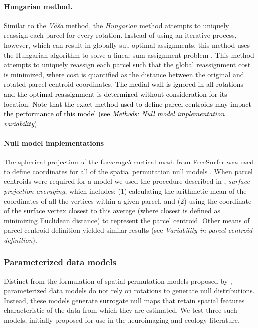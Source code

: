 \documentclass[12pt,aps,pra,reprint,showkeys]{revtex4-1}
\newcommand{\nimg}[1]{\textcolor{black}{{#1}}}
\begin{document}
\paragraph*{Hungarian method.}

Similar to the \textit{V{\'a}{\v{s}}a} method, the \textit{Hungarian} method attempts to uniquely reassign each parcel for every rotation.
Instead of using an iterative process, however, which can result in globally sub-optimal assignments, this method uses the Hungarian algorithm to solve a linear sum assignment problem \citep{kuhn1955hungarian}.
This method attempts to uniquely reassign each parcel such that the global reassignment cost is minimized, where cost is quantified as the distance between the original and rotated parcel centroid coordinates.
\nimg{The medial wall is ignored in all rotations and the optimal reassignment is determined without consideration for its location.
Note that the exact method used to define parcel centroids may impact the performance of this model (see \textit{Methods: Null model implementation variability}).}

\paragraph*{Null model implementations}

The spherical projection of the fsaverage5 cortical mesh from FreeSurfer was used to define coordinates for all of the spatial permutation null models \citep{fischl1999humanbrainmap}.
When parcel centroids were required for a model we used the procedure described in \citet{vazquezrodriguez2019pnas}, \textit{surface-projection averaging}, which includes: (1) calculating the arithmetic mean of the coordinates of all the vertices within a given parcel, and (2) using the coordinate of the surface vertex closest to this average (where closest is defined as minimizing Euclidean distance) to represent the parcel centroid.
Other means of parcel centroid definition yielded similar results (see \textit{Variability in parcel centroid definition}).

\subsubsection*{Parameterized data models}

Distinct from the formulation of spatial permutation models proposed by \citet{alexanderbloch2018neuroimage}, parameterized data models do not rely on rotations to generate null distributions.
Instead, these models generate surrogate null maps that retain spatial features characteristic of the data from which they are estimated.
We test three such models, initially proposed for use in the neuroimaging \citep{burt2018natneuro, burt2020neuroimage} and ecology \citep{wagner2015generating} literature.
\end{document}
